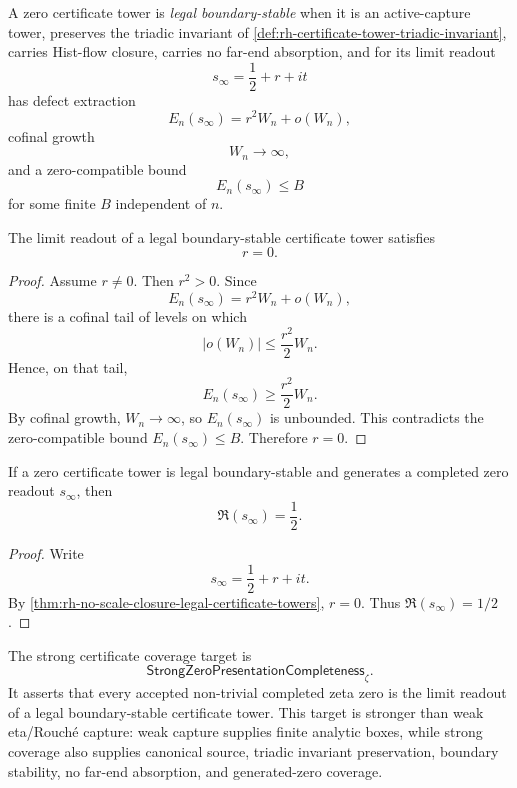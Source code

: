 \begin{definition}
\label{def:rh-legal-boundary-stable-certificate-tower}
A zero certificate tower is \emph{legal boundary-stable} when it is an
active-capture tower, preserves the triadic invariant of
\autoref{def:rh-certificate-tower-triadic-invariant}, carries Hist-flow
closure, carries no far-end absorption, and for its limit readout
$$
s_{\infty}=\frac12+r+it
$$
has defect extraction
$$
E_n(s_{\infty})=r^2W_n+o(W_n),
$$
cofinal growth
$$
W_n\to\infty,
$$
and a zero-compatible bound
$$
E_n(s_{\infty})\le B
$$
for some finite $B$ independent of $n$.
\end{definition}

\begin{theorem}
\label{thm:rh-no-scale-closure-legal-certificate-towers}
The limit readout of a legal boundary-stable certificate tower satisfies
$$
r=0.
$$
\end{theorem}

\begin{proof}
Assume $r\ne0$. Then $r^2>0$. Since
$$
E_n(s_{\infty})=r^2W_n+o(W_n),
$$
there is a cofinal tail of levels on which
$$
|o(W_n)|\le \frac{r^2}{2}W_n.
$$
Hence, on that tail,
$$
E_n(s_{\infty})\ge \frac{r^2}{2}W_n.
$$
By cofinal growth, $W_n\to\infty$, so $E_n(s_{\infty})$ is unbounded.
This contradicts the zero-compatible bound $E_n(s_{\infty})\le B$.
Therefore $r=0$.
\end{proof}

\begin{corollary}
\label{cor:rh-legal-certificate-towers-fixed-half-limits}
If a zero certificate tower is legal boundary-stable and generates a
completed zero readout $s_{\infty}$, then
$$
\Re(s_{\infty})=\frac12.
$$
\end{corollary}

\begin{proof}
Write
$$
s_{\infty}=\frac12+r+it.
$$
By \autoref{thm:rh-no-scale-closure-legal-certificate-towers}, $r=0$.
Thus $\Re(s_{\infty})=1/2$.
\end{proof}

\begin{definition}
\label{def:rh-strong-zero-presentation-completeness}
The strong certificate coverage target is
$$
\mathsf{StrongZeroPresentationCompleteness}_{\zeta}.
$$
It asserts that every accepted non-trivial completed zeta zero is the
limit readout of a legal boundary-stable certificate tower. This target
is stronger than weak eta/Rouch\'e capture: weak capture supplies finite
analytic boxes, while strong coverage also supplies canonical source,
triadic invariant preservation, boundary stability, no far-end
absorption, and generated-zero coverage.
\end{definition}

